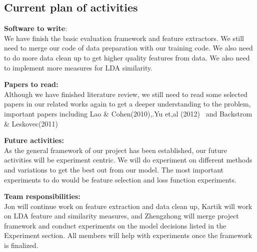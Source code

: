 \documentclass{article} %
\begin{document}
\subsection{Current plan of activities}
\textbf{Software to write}:\\
We have finish the basic evaluation framework and feature extractors. We still need to merge 
our code of data preparation with our training code. We also need to do more data clean up to get
higher quality features from data. We also need to implement more measures for LDA similarity.

\textbf{Papers to read:}\\
Although we have finished literature review, we still need to read some selected papers in our related works 
again to get a deeper understanding to the problem, important papers including Lao \& Cohen(2010),.Yu et,al (2012) \
and Backstrom \& Leskovec(2011)

\textbf{Future activities:}\\
As the general framework of our project has been established, our future activities will be experiment
centric. We will do experiment on different methods and variations to get the best out from our model. The
most important experiments to do would be feature selection and loss function experiments.

\textbf{Team responsibilities:}\\
Jon will continue work on feature extraction and data clean up, Kartik will work on LDA feature and similarity
measures, and Zhengzhong  will merge project framework and conduct experiments on the model decisions listed in
the Experiment section. All members will help with experiments once the framework is finalized.
\end{document}
